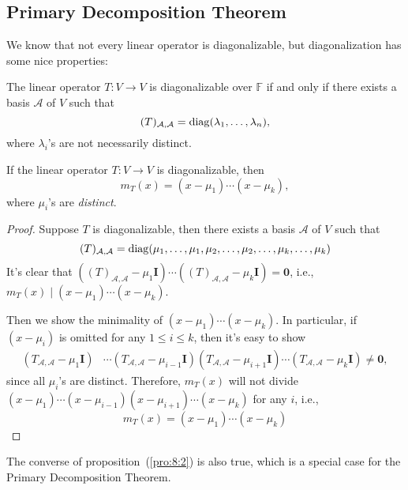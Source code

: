 \subsection{Primary Decomposition Theorem}

We know that not every linear operator is diagonalizable, but diagonalization has some nice properties:
\begin{definition}[diagonalizable]
The linear operator $T:V\to V$ is diagonalizable over $\mathbb{F}$ if and only if there exists a basis $\mathcal{A}$ of $V$ such that 
\[
(T)_{\mathcal{A},\mathcal{A}}=\operatorname{diag}(\lambda_1,\dots,\lambda_n),
\]
where $\lambda_i$'s are not necessarily distinct.
\end{definition}

\begin{proposition}\label{pro:8:2}
If the linear operator $T:V\to V$ is diagonalizable, then
\[
m_T(x) = (x-\mu_1)\cdots(x-\mu_k),
\]
where $\mu_i$'s are \emph{distinct}.
\end{proposition}
\begin{proof}
Suppose $T$ is diagonalizable, then there exists a basis $\mathcal{A}$ of $V$ such that
\[
(T)_{\mathcal{A},\mathcal{A}}=\operatorname{diag}(\mu_1,\dots,\mu_1,\mu_2,\dots,\mu_2,\dots,\mu_k,\dots,\mu_k)
\]
It's clear that $((T)_{\mathcal{A},\mathcal{A}}-\mu_1\bm I)\cdots((T)_{\mathcal{A},\mathcal{A}}-\mu_k\bm I)=\bm0$, i.e., $m_T(x)\mid (x-\mu_1)\cdots(x-\mu_k)$.

Then we show the minimality of $(x-\mu_1)\cdots(x-\mu_k)$.
In particular, if $(x-\mu_i)$ is omitted for any $1\le i\le k$, then it's easy to show
\begin{align*}
(T_{\mathcal{A},\mathcal{A}}-\mu_1\bm I)&\cdots
(T_{\mathcal{A},\mathcal{A}}-\mu_{i-1}\bm I)
(T_{\mathcal{A},\mathcal{A}}-\mu_{i+1}\bm I)
\cdots
(T_{\mathcal{A},\mathcal{A}}-\mu_{k}\bm I)
\ne\bm0,
\end{align*}
since all $\mu_i$'s are distinct.
Therefore, $m_T(x)$ will not divide $(x-\mu_1)\cdots(x-\mu_{i-1})(x-\mu_{i+1})\cdots(x-\mu_k)$ for any $i$, i.e.,
\[
m_T(x)=(x-\mu_1)\cdots(x-\mu_k)
\]

\end{proof}
\begin{remark}
The converse of proposition~(\ref{pro:8:2}) is also true, which is a special case for the Primary Decomposition Theorem.
\end{remark}

